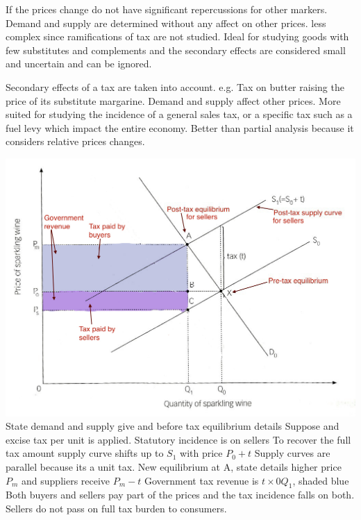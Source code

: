 \documentclass[12pt]{examnotes}
\begin{document}
\ra If the prices change do not have  significant repercussions for other markers. Demand and supply are determined without any affect on other prices.
\ra less complex since ramifications of tax are not studied.
\ra Ideal for studying goods with few substitutes and complements and the secondary effects are considered small and uncertain and can be ignored.

\ra Secondary effects of a tax are taken into account. e.g. Tax on butter raising the price of its substitute margarine. Demand and supply affect other prices.
\ra More suited for studying the incidence of a general sales tax, or a specific tax such as a fuel levy which impact the entire economy.
\ra Better than partial analysis because it considers relative prices changes.


\includegraphics[scale=0.3]{./imgs/101.jpg} 
\ra State demand and supply give and before tax equilibrium details
\ra Suppose and excise tax per unit is applied. 
 Statutory incidence is on sellers 
\rna To recover the full tax amount supply curve shifts up to $S_1$ with price $P_0+t$
\rna Supply curves are parallel because its a unit tax.
\rna New equilibrium at A, state details higher price $P_m$ and suppliers receive $P_m-t$
\rna Government tax revenue is $t \times 0Q_1 $, shaded blue
\rna Both buyers and sellers pay part of the prices and the tax incidence falls on both. Sellers do not pass on full tax burden to consumers.
\end{document}
